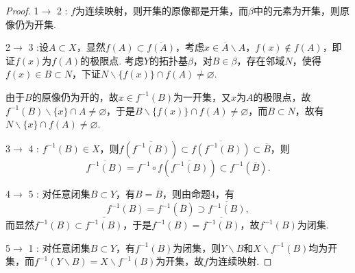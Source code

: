 \documentclass[12pt]{ctexart}
\theoremstyle{definition}
\theoremstyle{plain}
\begin{document}
	\begin{proof}
		1$\to$ 2 : $f$为连续映射，则开集的原像都是开集，而$\beta$中的元素为开集，则原像仍为开集.
		
		2$\to$ 3 :设$A\subset X$，显然$f(A)\subset\overline{f(A)}$，考虑$x\in \overline{A}\backslash A$，$f(x)\notin f(A)$，即证$f(x)$为$f(A)$的极限点. 考虑$Y$的拓扑基$\beta$，对$B\in \beta$，存在邻域$N$，使得$f(x)\in B\subset N$，下证$N\backslash\{f(x)\}\cap f(A)\neq\varnothing$.
		
		由于$B$的原像仍为开的，故$x\in f^{-1}(B)$为一开集，又$x$为$A$的极限点，故$f^{-1}(B)\backslash\{x\}\cap A\neq \varnothing$，于是$B\backslash\{f(x)\}\cap f(A)\neq\varnothing$，而$B\subset N$，故有$N\backslash\{x\}\cap f(A)\neq\varnothing$.
		
		3$\to$ 4 : $f^{-1}(B)\in X$，则$f\left(\overline{f^{-1}(B)}\right)\subset\overline{f\left(f^{-1}(B)\right)}\subset\overline{B}$，则
		$$\overline{f^{-1}(B)}= f^{-1}\circ f\left(\overline{f^{-1}(B)}\right)\subset f^{-1}(\overline{B}).$$
		
		4$\to$ 5 : 对任意闭集$B\subset Y$，有$B=\overline{B}$，则由命题4，有
		$$f^{-1}(B)=f^{-1}(\overline{B})\supset\overline{f^{-1}(B)},$$
		而显然$f^{-1}(B)\subset\overline{f^{-1}(B)}$，于是$f^{-1}(B)=\overline{f^{-1}(B)}$，故$f^{-1}(B)$为闭集.
		
		5$\to$ 1 : 对任意闭集$B\subset Y$，有$f^{-1}(B)$为闭集，则$Y\backslash B$和$X\backslash f^{-1}(B)$均为开集，而$f^{-1}(Y\backslash B)=X\backslash f^{-1}(B)$为开集，故$f$为连续映射.
	\end{proof}
\end{document}

